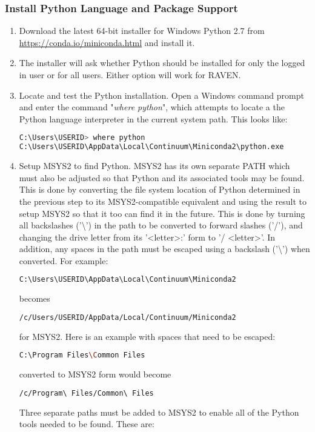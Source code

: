 \subsubsection{Install Python Language and Package Support}
\begin{enumerate}
	\item Download the latest 64-bit installer for Windows Python 2.7 from
		\url{https://conda.io/miniconda.html} and install it.  \item The installer
		will ask whether Python should be installed for only the logged in user or
		for all users.  Either option will work for RAVEN.
	\item Locate and test the Python installation.   Open a Windows command prompt and enter the
		command "{\it where python}", which attempts to locate a the Python language interpreter
		in the current system path.  This looks like:

\begin{lstlisting}[language=bash, basicstyle=\small]
C:\Users\USERID> where python
C:\Users\USERID\AppData\Local\Continuum\Miniconda2\python.exe
\end{lstlisting}

	\item Setup MSYS2 to find Python.  MSYS2 has its own separate PATH which must also be adjusted
		so that Python and its associated tools may be found. This is done by converting the
		file system location of Python determined in the previous step to its MSYS2-compatible
		equivalent and using the result to setup MSYS2 so that it too can find it in the future.
		\newline \newline
		This is done by turning all backslashes ('\textbackslash') in the path to be converted to
		forward slashes ('/'), and changing the drive letter from its '\textless letter\textgreater:'
		form to '/ \textless letter\textgreater'. In addition, any spaces in the path must
		be escaped using a backslash ('\textbackslash') when converted.
		\newline \newline
		For example:

\begin{lstlisting}[language=bash]
C:\Users\USERID\AppData\Local\Continuum\Miniconda2
\end{lstlisting}
		becomes
\begin{lstlisting}[language=bash]
/c/Users/USERID/AppData/Local/Continuum/Miniconda2
\end{lstlisting}
		for MSYS2. Here is an example with spaces that need to be escaped:
\begin{lstlisting}[language=bash]
C:\Program Files\Common Files
\end{lstlisting}
		converted to MSYS2 form would become
\begin{lstlisting}[language=bash]
/c/Program\ Files/Common\ Files
\end{lstlisting}
		\medskip
		Three separate paths must be added to MSYS2 to enable all of the Python tools needed
		to be found.  These are:


\end{enumerate}
